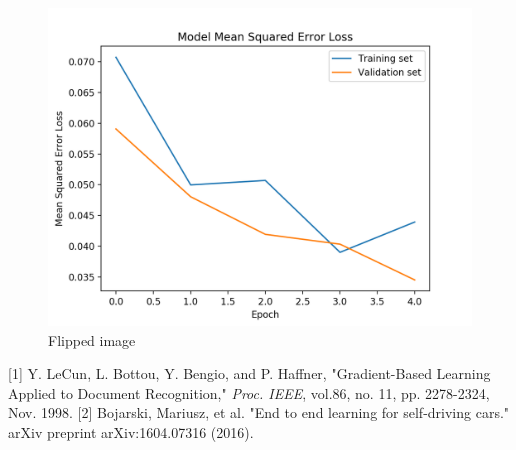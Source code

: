 \documentclass[12pt]{article}
\begin{document}
\begin{figure}[h]
\centering
\includegraphics[scale = 1]{train_validation_loss.png}
\caption{Flipped image}
\end{figure}

[1] Y. LeCun, L. Bottou, Y. Bengio, and P. Haffner, "Gradient-Based Learning Applied to Document Recognition," \textit{Proc. IEEE}, vol.86, no. 11, pp. 2278-2324, Nov. 1998.
[2] Bojarski, Mariusz, et al. "End to end learning for self-driving cars." arXiv preprint arXiv:1604.07316 (2016).
\end{document}
